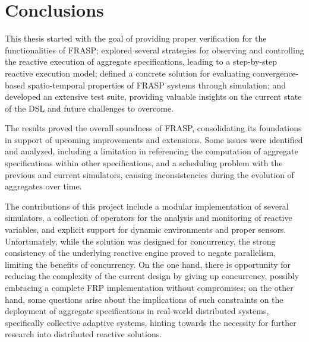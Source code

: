 
\chapter{Conclusions}
\label{chapter:conclusions}

This thesis started with the goal of providing proper verification for the
functionalities of FRASP; explored several strategies for observing and
controlling the reactive execution of aggregate specifications, leading to a
step-by-step reactive execution model; defined a concrete solution for
evaluating convergence-based spatio-temporal properties of FRASP systems
through simulation; and developed an extensive test suite, providing valuable
insights on the current state of the \ac{DSL} and future challenges to
overcome.

The results proved the overall soundness of FRASP, consolidating its
foundations in support of upcoming improvements and extensions. Some issues
were identified and analyzed, including a limitation in referencing the
computation of aggregate specifications within other specifications, and a
scheduling problem with the previous and current simulators, causing
inconsistencies during the evolution of aggregates over time.

The contributions of this project include a modular implementation of several
simulators, a collection of operators for the analysis and monitoring of
reactive variables, and explicit support for dynamic environments and proper
sensors. Unfortunately, while the solution was designed for concurrency, the
strong consistency of the underlying reactive engine proved to negate
parallelism, limiting the benefits of concurrency. On the one hand, there is
opportunity for reducing the complexity of the current design by giving up
concurrency, possibly embracing a complete \ac{FRP} implementation without
compromises; on the other hand, some questions arise about the implications of
such constraints on the deployment of aggregate specifications in real-world
distributed systems, specifically collective adaptive systems, hinting towards
the necessity for further research into distributed reactive solutions.
